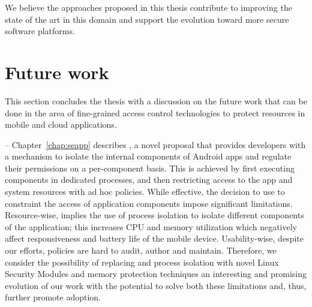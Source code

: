 We believe the approaches proposed in this thesis contribute to
improving the state of the art in this domain and support the
evolution toward more secure software platforms.

\section{Future work}

This section concludes the thesis with a discussion on the future work
that can be done in the area of fine-grained access control
technologies to protect resources in mobile and cloud applications.

 -- Chapter~\ref{chap:seapp}
describes \seapp, a novel proposal that provides developers with a
mechanism to isolate the internal components of Android apps and
regulate their permissions on a per-component basis. This is
achieved by first executing components in dedicated processes, and
then restricting access to the app and system resources with ad hoc
\sel policies. While effective, the decision to use \sel to constraint
the access of application components impose significant limitations.
Resource-wise, \sel implies the use of process isolation to isolate
different components of the application; this increases CPU and memory
utilization which negatively affect responsiveness and battery life of
the mobile device. Usability-wise, despite our efforts, \sel policies
are hard to audit, author and maintain. Therefore, we consider the
possibility of replacing \sel and process isolation with novel Linux
Security Modules and memory protection techniques an interesting and
promising evolution of our work with the potential to solve both these
limitations and, thus, further promote adoption.

